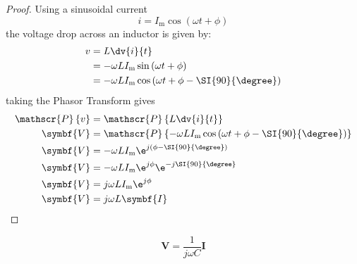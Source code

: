 \documentclass{article}
\begin{document}
\begin{proof}
    Using a sinusoidal current
    \begin{equation*}
        i = I_{\mathrm{m}}\cos{\left( \omega t + \phi \right)}
    \end{equation*}
    the voltage drop across an inductor is given by:
    \begin{align*}
        v & = L \dv{i}{t}                                                                      \\
        & = -\omega L I_{\mathrm{m}} \sin{\left( \omega t + \phi \right)}                    \\
        & = -\omega L I_{\mathrm{m}} \cos{\left( \omega t + \phi - \SI{90}{\degree} \right)}
    \end{align*}
    taking the Phasor Transform gives
    \begin{align*}
        \mathscr{P}\left\{ v \right\} & = \mathscr{P}\left\{ L \dv{i}{t} \right\}                                                                      \\
        \symbf{V}                     & = \mathscr{P}\left\{ -\omega L I_{\mathrm{m}} \cos{\left( \omega t + \phi - \SI{90}{\degree} \right)} \right\} \\
        \symbf{V}                     & = -\omega L I_{\mathrm{m}} \e^{j\left( \phi - \SI{90}{\degree} \right)}                                        \\
        \symbf{V}                     & = -\omega L I_{\mathrm{m}} \e^{j \phi} \e^{-j\SI{90}{\degree}}                                                 \\
        \symbf{V}                     & = j\omega L I_{\mathrm{m}} \e^{j \phi}                                                                         \\
        \symbf{V}                     & = j\omega L \symbf{I}
    \end{align*}
\end{proof}
\begin{theorem}
    \begin{equation*}
        \symbf{V} = \frac{1}{j\omega C}\symbf{I}
    \end{equation*}
\end{theorem}
\end{document}
